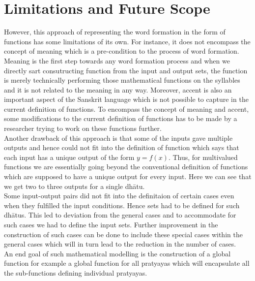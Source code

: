 \section{Limitations and Future Scope}
However, this approach of representing the word formation in the form of functions has some limitations of its own. For instance, it does not encompass the concept of meaning which is a pre-condition to the process of word formation. Meaning is the first step towards any word formation process and when we directly sart consutructing function from the input and output sets, the function is merely technically performing those mathematical functions on the syllables and it is not related to the meaning in any way. Moreover, accent is also an important aspect of the Sanskrit language which is not possible to capture in the current definition of functions. 
To encompass the concept of meaning and accent, some modifications to the current definition of functions has to be made by a researcher trying to work on these functions further. \\
Another drawback of this approach is that some of the inputs gave multiple outputs and hence could not fit into the definition of function which says that each input has a unique output of the form $y = f (x)$. Thus, for multivalued functions we are essentially going beyond the conventional definition of functions which are supposed to have a unique output for every input. Here we can see that we get two to three outputs for a single dhātu.\\
Some input-output pairs did not fit into the definitaion of certain cases even when they fulfilled the input conditions. Hence sets had to be defined for such dhātus. This led to deviation from the general cases and to accommodate for such cases we had to define the input sets. Further improvement in the construction of such cases can be done to include these special cases within the general cases which will in turn lead to the reduction in the number of cases.\\

An end goal of such mathematical modelling is the construction of a global function for example a global function for all pratyayas which will encapsulate all the sub-functions defining individual pratyayas.



